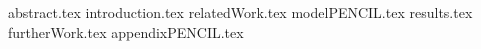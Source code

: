 \documentclass[a4paper,english,cleveref, autoref]{lipics-v2019}
\begin{document}
{abstract.tex}
{introduction.tex}
{relatedWork.tex}
{modelPENCIL.tex}
{results.tex}
{furtherWork.tex}
{appendixPENCIL.tex}

\end{document}
